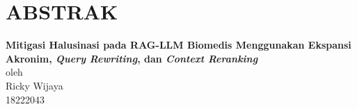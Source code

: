\chapter*{ABSTRAK}

\begin{center}

    \textbf{Mitigasi Halusinasi pada RAG-LLM Biomedis Menggunakan Ekspansi Akronim, \textit{Query Rewriting}, dan \textit{Context Reranking}} \\
    \vspace{0.25cm}
    oleh \\
    \vspace{0.25cm}
    Ricky Wijaya\\
    18222043\\
\end{center}


